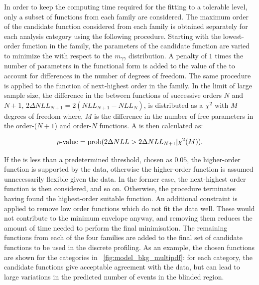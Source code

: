 In order to keep the computing time required for the fitting to a tolerable level, only a subset of functions from each family are considered. The maximum order of the candidate function considered from each family is obtained separately for each analysis category using the following procedure. Starting with the lowest-order function in the family, the parameters of the candidate function are varied to minimize the \NLL with respect to the $m_{\gamma\gamma}$ distribution. A penalty of $1$ times the number of parameters in the functional form is added to the value of the \NLL to account for differences in the number of degrees of freedom. The same procedure is applied to the function of next-highest order in the family. 
In the limit of large sample size, the difference in the \NLL between functions of successive orders $N$ and $N+1$, $2 \Delta NLL_{N+1} = 2(NLL_{N+1} - NLL_{N})$, is distributed as a $\chi^2$ with $M$ degrees of freedom where, $M$ is the difference in the number of free parameters in the order-($N+1$)  and order-$N$ functions. A \pvalue is then calculated as:

$$ \text{\ensuremath{\,p{\text{-value}}}} = \text{prob}(2 \Delta NLL > 2 \Delta NLL_{N+1}| \chi^2(M)). $$

If the \pvalue is less than a predetermined threshold, chosen as $0.05$, the higher-order function is supported by the data, otherwise the higher-order function is assumed unnecessarily flexible given the data. In the former case, the next-highest order function is then considered, and so on. Otherwise, the procedure terminates having found the highest-order suitable function.  An additional constraint is applied to remove low order functions which do not fit the data well. These would not contribute to the minimum envelope anyway, and removing them reduces the amount of time needed to perform the final minimisation. The remaining functions from each of the four families are added to the final set of candidate functions to be used in the discrete profiling. As an example, the chosen functions are shown for the \Untagged categories in \Fig~\ref{fig:model_bkg_multipdf}: for each category, the candidate functions give acceptable agreement with the data, but can lead to large variations in the predicted number of events in the blinded region.  %

